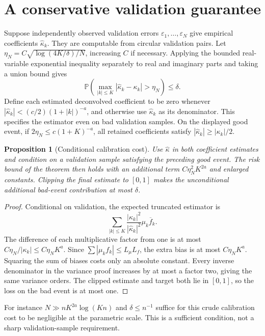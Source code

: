 \documentclass[11pt,a4paper]{article}
\newtheorem{proposition}[theorem]{Proposition}
\theoremstyle{definition}
\theoremstyle{remark}
\newcommand{\Prb}{\mathbb P}
\begin{document}
\section{A conservative validation guarantee}
Suppose independently observed validation errors $\varepsilon_1,\ldots,\varepsilon_N$ give empirical coefficients $\hat\kappa_k$. They are computable from circular validation pairs. Let
$\eta_N=C\sqrt{\log(4K/\delta)/N}$, increasing $C$ if necessary. Applying the bounded real-variable exponential inequality separately to real and imaginary parts and taking a union bound gives
\[
 \Prb\left(\max_{|k|\le K}|\hat\kappa_k-\kappa_k|>\eta_N\right)\le\delta.
\]
Define each estimated deconvolved coefficient to be zero whenever $|\hat\kappa_k|<(c/2)(1+|k|)^{-a}$, and otherwise use $\hat\kappa_k$ as its denominator. This specifies the estimator even on bad validation samples. On the displayed good event, if
$2\eta_N\le c(1+K)^{-a}$, all retained coefficients satisfy
$|\hat\kappa_k|\ge|\kappa_k|/2$.

\begin{proposition}[Conditional calibration cost]
Use $\hat\kappa$ in both coefficient estimates and condition on a validation sample satisfying the preceding good event. The risk bound of the theorem then holds with an additional term $C\eta_N^2K^{2a}$ and enlarged constants. Clipping the final estimate to $[0,1]$ makes the unconditional additional bad-event contribution at most $\delta$.
\end{proposition}
\begin{proof}
Conditional on validation, the expected truncated estimator is
\[
 \sum_{|k|\le K}\frac{|\kappa_k|^2}{|\hat\kappa_k|^2}
                          \mu_k\overline f_k.
\]
The difference of each multiplicative factor from one is at most
$C\eta_N/|\kappa_k|\le C\eta_NK^a$. Since
$\sum|\mu_kf_k|\le L_\mu L_f$, the extra bias is at most $C\eta_NK^a$. Squaring the sum of biases costs only an absolute constant. Every inverse denominator in the variance proof increases by at most a factor two, giving the same variance orders. The clipped estimate and target both lie in $[0,1]$, so the loss on the bad event is at most one.
\end{proof}

For instance $N\gg nK^{2a}\log(Kn)$ and $\delta\le n^{-1}$ suffice for this crude calibration cost to be negligible at the parametric scale. This is a sufficient condition, not a sharp validation-sample requirement.
\end{document}
